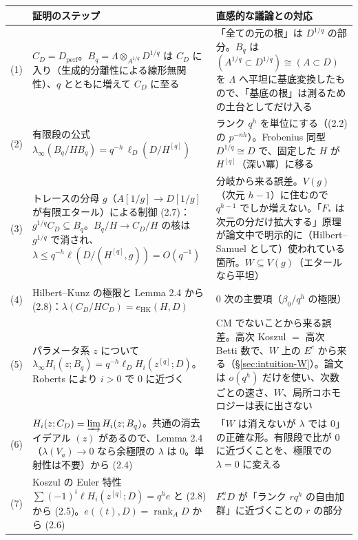 \documentclass[11pt,a4paper]{ltjsarticle}
\numberwithin{equation}{section}
\theoremstyle{plain}
\theoremstyle{definition}
\theoremstyle{definition}
\newcommand{\rank}{\operatorname{rank}}
\begin{document}
\begin{center}
\small
\begin{tabularx}{\textwidth}{>{\raggedright}p{0.6cm}>{\raggedright}X>{\raggedright\arraybackslash}X}
\toprule
 & 証明のステップ & 直感的な議論との対応 \\
\midrule
(1) & $C_D = D_{\mathrm{perf}}$。$B_q = \Lambda\otimes_{A^{1/q}}D^{1/q}$ は $C_D$ に入り（生成的分離性による線形無関性）、$q$ とともに増えて $C_D$ に至る & 「全ての元の根」は $D^{1/q}$ の部分。$B_q$ は $(A^{1/q}\subset D^{1/q})\cong(A\subset D)$ を $\Lambda$ へ平坦に基底変換したもので、「基底の根」は測るための土台としてだけ入る \\
(2) & 有限段の公式 $\lambda_\infty(B_q/HB_q) = q^{-h}\,\ell_D(D/H^{[q]})$ & ランク $q^h$ を単位にする（(2.2) の $p^{-nh}$）。Frobenius 同型 $D^{1/q}\cong D$ で、固定した $H$ が $H^{[q]}$（深い冪）に移る \\
(3) & トレースの分母 $g$（$A[1/g]\to D[1/g]$ が有限エタール）による制御 (2.7)：$g^{1/q}C_D\subseteq B_q$。$B_q/H\to C_D/H$ の核は $g^{1/q}$ で消され、$\lambda\le q^{-h}\ell(D/(H^{[q]},g)) = O(q^{-1})$ & 分岐から来る誤差。$V(g)$（次元 $h-1$）に住むので $q^{h-1}$ でしか増えない。「$F_*$ は次元の分だけ拡大する」原理が論文中で明示的に（Hilbert--Samuel として）使われている箇所。$W\subseteq V(g)$（エタールなら平坦） \\
(4) & Hilbert--Kunz の極限と Lemma 2.4 から (2.8)：$\lambda(C_D/HC_D) = e_{\mathrm{HK}}(H,D)$ & $0$ 次の主要項（$\beta_0/q^h$ の極限） \\
(5) & パラメータ系 $z$ について $\lambda_\infty H_i(z;B_q) = q^{-h}\ell_D H_i(z^{[q]};D)$。Roberts により $i>0$ で $0$ に近づく & CM でないことから来る誤差。高次 Koszul $=$ 高次 Betti 数で、$W$ 上の $E^c$ から来る（\S\ref{sec:intuition-W}）。論文は $o(q^h)$ だけを使い、次数ごとの速さ、$W$、局所コホモロジーは表に出さない \\
(6) & $H_i(z;C_D) = \varinjlim H_i(z;B_q)$。共通の消去イデアル $(z)$ があるので、Lemma 2.4（$\lambda(V_a)\to0$ なら余極限の $\lambda$ は $0$。単射性は不要）から (2.4) & 「$W$ は消えないが $\lambda$ では $0$」の正確な形。有限段で比が $0$ に近づくことを、極限での $\lambda = 0$ に変える \\
(7) & Koszul の Euler 特性 $\sum(-1)^i\ell H_i(z^{[q]};D) = q^h e$ と (2.8) から (2.5)。$e((t),D) = \rank_A D$ から (2.6) & $F^n_*D$ が「ランク $r q^h$ の自由加群」に近づくことの $r$ の部分 \\
\bottomrule
\end{tabularx}
\end{center}
\end{document}
